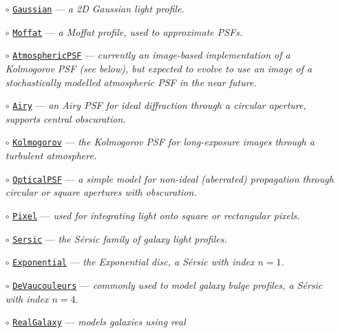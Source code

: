 \documentclass[preprint,11pt]{aastex}
\begin{document}
\begin{itemize}
\item[$\circ$]
  \href{http://galsim-developers.github.com/GalSim/classgalsim_1_1base_1_1_gaussian.html}{\texttt{Gaussian}}
  --- \emph{a 2D Gaussian light profile.}
\item[$\circ$] \href{http://galsim-developers.github.com/GalSim/classgalsim_1_1base_1_1_moffat.html}{\texttt{Moffat}} --- \emph{a Moffat profile, used to approximate PSFs.}
\item[$\circ$] \href{http://galsim-developers.github.com/GalSim/classgalsim_1_1base_1_1_atmospheric_p_s_f.html}{\texttt{AtmosphericPSF}} --- \emph{currently an image-based
  implementation of a Kolmogorov PSF (see below), but expected to evolve to
  use an image of a stochastically modelled atmospheric PSF in the near future.}
\item[$\circ$] \href{http://galsim-developers.github.com/GalSim/classgalsim_1_1base_1_1_airy.html}{\texttt{Airy}} --- \emph{an Airy PSF for ideal diffraction
  through a circular aperture, supports central obscuration.}
\item[$\circ$] \href{http://galsim-developers.github.com/GalSim/classgalsim_1_1base_1_1_kolmogorov.html}{\texttt{Kolmogorov}} --- \emph{the Kolmogorov PSF for long-exposure
  images through a turbulent atmosphere.}
\item[$\circ$] \href{http://galsim-developers.github.com/GalSim/classgalsim_1_1base_1_1_optical_p_s_f.html}{\texttt{OpticalPSF}} --- \emph{a simple model for non-ideal
  (aberrated) propagation through circular or square apertures with obscuration.}
\item[$\circ$] \href{http://galsim-developers.github.com/GalSim/classgalsim_1_1base_1_1_pixel.html}{\texttt{Pixel}} --- \emph{used for integrating light onto square or
  rectangular pixels.}
\item[$\circ$] \href{http://galsim-developers.github.com/GalSim/classgalsim_1_1base_1_1_sersic.html}{\texttt{Sersic}} ---\emph{ the S\'{e}rsic family of galaxy light
  profiles.}
\item[$\circ$] \href{http://galsim-developers.github.com/GalSim/classgalsim_1_1base_1_1_exponential.html}{\texttt{Exponential}} --- \emph{the Exponential disc, a S\'{e}rsic
  with index $n=1$.}
\item[$\circ$] \href{http://galsim-developers.github.com/GalSim/classgalsim_1_1base_1_1_de_vaucouleurs.html}{\texttt{DeVaucouleurs}} --- \emph{commonly used to model galaxy bulge
  profiles, a S\'{e}rsic with index $n=4$.}
\item[$\circ$] \href{http://galsim-developers.github.com/GalSim/classgalsim_1_1base_1_1_real_galaxy.html}{\texttt{RealGalaxy}} --- \emph{models galaxies using real
}
\end{itemize}
\end{document}
